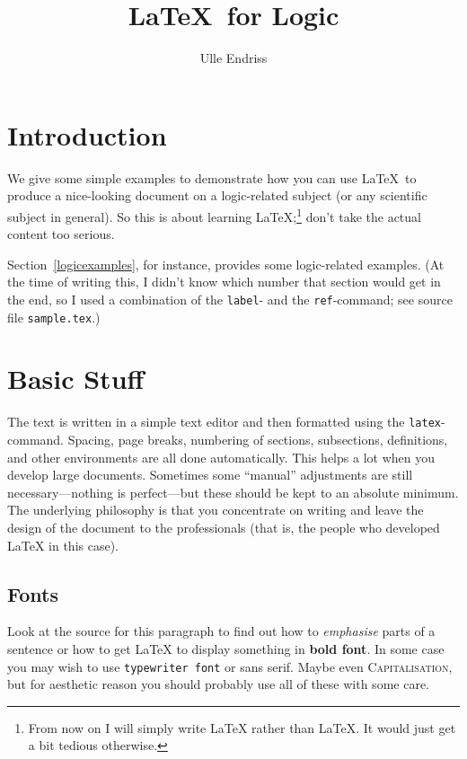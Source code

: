 \documentclass[11pt]{article}
\title{\textbf{\LaTeX\ for Logic}}
\author{Ulle Endriss}
\begin{document}
\maketitle


\section{Introduction}

We give some simple examples to demonstrate how you can use \LaTeX\ to produce 
a nice-looking document on a logic-related subject (or any scientific subject
in general). So this is about learning \LaTeX;\footnote{From now on I will 
simply write LaTeX rather than \LaTeX. It would just get a bit tedious otherwise.} 
don't take the actual content too serious.

Section~\ref{logicexamples}, for instance, provides some logic-related examples. 
(At the time of writing this, I didn't know which number that section would 
get in the end, so I used a combination of the \texttt{label}- and the
\texttt{ref}-command; see source file \texttt{sample.tex}.)



\section{Basic Stuff}

The text is written in a simple text editor and then formatted using the 
\texttt{latex}-command. Spacing, page breaks, numbering of sections, subsections,
definitions, and other environments are all done automatically. This helps a lot
when you develop large documents. Sometimes some ``manual'' adjustments are still
necessary---nothing is perfect---but these should be kept to an absolute minimum.
The underlying philosophy is that you concentrate on writing and leave the
design of the document to the professionals (that is, the people who developed 
LaTeX in this case).

\subsection{Fonts}

Look at the source for this paragraph to find out how to \emph{emphasise} parts
of a sentence or how to get LaTeX to display something in \textbf{bold font}.
In some case you may wish to use \texttt{typewriter font} or \textsf{sans serif}.
Maybe even \textsc{Capitalisation}, but for aesthetic reason you should probably
use all of these with some care.
\end{document}
